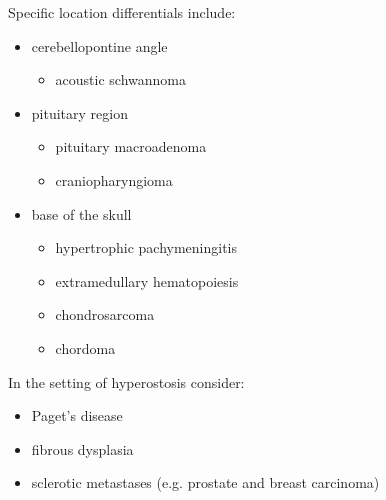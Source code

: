 Specific location differentials include:

\begin{itemize}
	\item
	cerebellopontine angle
	
	\begin{itemize}
		\item
		acoustic schwannoma
	\end{itemize}
	\item
	pituitary region
	
	\begin{itemize}
		\item
		pituitary macroadenoma
		\item
		craniopharyngioma
	\end{itemize}
	\item
	base of the skull
	
	\begin{itemize}
		\item
		hypertrophic pachymeningitis
		\item
		extramedullary hematopoiesis
		\item
		chondrosarcoma
		\item
		chordoma
	\end{itemize}
\end{itemize}

In the setting of hyperostosis consider:

\begin{itemize}
	\item
	Paget's disease
	\item
	fibrous dysplasia
	\item
	sclerotic metastases (e.g. prostate and breast carcinoma)
\end{itemize}
